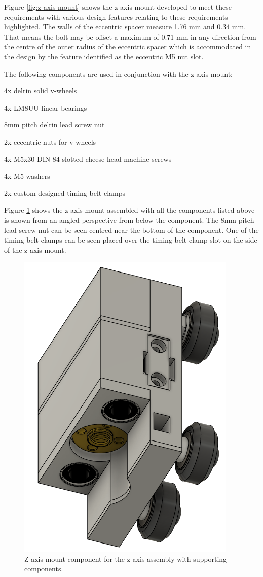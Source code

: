 Figure \ref{fig:z-axis-mount} shows the z-axis mount developed to meet these requirements with various design features relating to these requirements highlighted. The walls of the eccentric spacer measure 1.76 mm and 0.34 mm. That means the bolt may be offset a maximum of 0.71 mm in any direction from the centre of the outer radius of the eccentric spacer which is accommodated in the design by the feature identified as the eccentric M5 nut slot.

The following components are used in conjunction with the z-axis mount:

\begin{compactitem}
	\item 4x delrin solid v-wheels
	\item 4x LM8UU linear bearings
	\item 8mm pitch delrin lead screw nut
	\item 2x eccentric nuts for v-wheels
	\item 4x M5x30 DIN 84 slotted cheese head machine screws
	\item 4x M5 washers
	\item 2x custom designed timing belt clamps
\end{compactitem}

Figure \ref{fig:z-axis-mount-assembled} shows the z-axis mount assembled with all the components listed above is shown from an angled perspective from below the component. The 8mm pitch lead screw nut can be seen centred near the bottom of the component. One of the timing belt clamps can be seen placed over the timing belt clamp slot on the side of the z-axis mount.

\begin{figure}[H]
	\centering
	\includegraphics[width=0.3\linewidth]{figures/z-axis-mount-assembled.png}
	\caption{Z-axis mount component for the z-axis assembly with supporting components.}
	\label{fig:z-axis-mount-assembled}
\end{figure}

